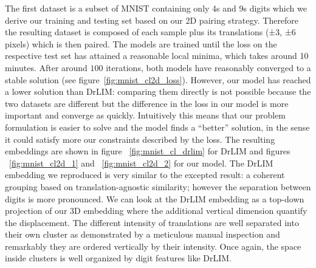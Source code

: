 \documentclass[a4paper,12pt]{report}
\begin{document}
The first dataset is a subset of MNIST containing only 4s and 9s digits which we derive our training and testing set based on our 2D pairing strategy.
Therefore the resulting dataset is composed of each sample plus its translations (±3, ±6 pixels) which is then paired.
The models are trained until the loss on the respective test set has attained a reasonable local minima, which takes around 10 minutes.
After around $100$ iterations, both models have reasonably converged to a stable solution (see figure~\ref{fig:mnist_cl2d_loss}).
However, our model has reached a lower solution than DrLIM: comparing them directly is not possible because the two datasets are different but the difference in the loss in our model is more important and converge as quickly.
Intuitively this means that our problem formulation is easier to solve and the model finds a ``better'' solution, in the sense it could satisfy more our constraints described by the loss.
The resulting embeddings are shown in figure ~\ref{fig:mnist_cl_drlim} for DrLIM and figures ~\ref{fig:mnist_cl2d_1} and ~\ref{fig:mnist_cl2d_2} for our model.
The DrLIM embedding we reproduced is very similar to the excepted result: a coherent grouping based on translation-agnostic similarity; however the separation between digits is more pronounced.
We can look at the DrLIM embedding as a top-down projection of our 3D embedding where the additional vertical dimension quantify the displacement.
The different intensity of translations are well separated into their own cluster as demonstrated by a meticulous manual inspection and remarkably they are ordered vertically by their intensity.
Once again, the space inside clusters is well organized by digit features like DrLIM.
\end{document}
